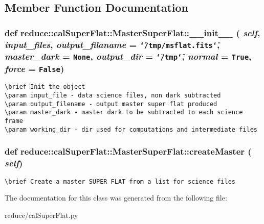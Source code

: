 \subsection{Member Function Documentation}
\subsubsection{\setlength{\rightskip}{0pt plus 5cm}def reduce::cal\-Super\-Flat::Master\-Super\-Flat::\_\-\_\-init\_\-\_\- ( {\em self},  {\em input\_\-files},  {\em output\_\-filaname} = {\tt \char`\"{}/tmp/msflat.fits\char`\"{}},  {\em master\_\-dark} = {\tt None},  {\em output\_\-dir} = {\tt \char`\"{}/tmp\char`\"{}},  {\em normal} = {\tt True},  {\em force} = {\tt False})}\label{classreduce_1_1calSuperFlat_1_1MasterSuperFlat_37a01235bdf44faf9dae9e995a83bfb8}




\footnotesize\begin{verbatim}
\brief Init the object
\param input_file - data science files, non dark subtracted
\param output_filename - output master super flat produced 
\param master_dark - master dark to be subtracted to each science frame
\param working_dir - dir used for computations and intermediate files
\end{verbatim}
\normalsize
\subsubsection{\setlength{\rightskip}{0pt plus 5cm}def reduce::cal\-Super\-Flat::Master\-Super\-Flat::create\-Master ( {\em self})}\label{classreduce_1_1calSuperFlat_1_1MasterSuperFlat_b04bacd62ca9d794c172cc7ea9b09027}




\footnotesize\begin{verbatim}
\brief Create a master SUPER FLAT from a list for science files
\end{verbatim}
\normalsize
 

The documentation for this class was generated from the following file:\begin{CompactItemize}
\item 
reduce/cal\-Super\-Flat.py\end{CompactItemize}
